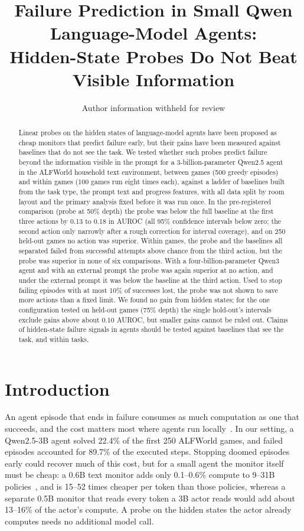 \documentclass[10pt]{article}
\title{Failure Prediction in Small Qwen Language-Model Agents:\\Hidden-State Probes Do Not Beat Visible Information}
\author{Author information withheld for review}
\date{}
\begin{document}
\maketitle

\begin{abstract}
Linear probes on the hidden states of language-model agents have been proposed as cheap monitors that predict failure early, but their gains have been measured against baselines that do not see the task.
We tested whether such probes predict failure beyond the information visible in the prompt for a 3-billion-parameter Qwen2.5 agent in the ALFWorld household text environment,
between games (500 greedy episodes) and within games (100 games run eight times each), against a ladder of baselines built from the task type, the prompt text and progress features, with all data split by room layout and the primary analysis fixed before it was run once.
In the pre-registered comparison (probe at 50\% depth) the probe was below the full baseline at the first three actions by 0.13 to 0.18 in AUROC (all 95\% confidence intervals below zero; the second action only narrowly after a rough correction for interval coverage), and on 250 held-out games no action was superior.
Within games, the probe and the baselines all separated failed from successful attempts above chance from the third action, but the probe was superior in none of six comparisons.
With a four-billion-parameter Qwen3 agent and with an external prompt the probe was again superior at no action, and under the external prompt it was below the baseline at the third action.
Used to stop failing episodes with at most 10\% of successes lost, the probe was not shown to save more actions than a fixed limit.
We found no gain from hidden states; for the one configuration tested on held-out games (75\% depth) the single hold-out's intervals exclude gains above about 0.10 AUROC, but smaller gains cannot be ruled out.
Claims of hidden-state failure signals in agents should be tested against baselines that see the task, and within tasks.
\end{abstract}

\section{Introduction}
An agent episode that ends in failure consumes as much computation as one that succeeds, and the cost matters most where agents run locally~\cite{pham2026agentstop}.
In our setting, a Qwen2.5-3B agent solved 22.4\% of the first 250 ALFWorld games, and failed episodes accounted for 89.7\% of the executed steps.
Stopping doomed episodes early could recover much of this cost, but for a small agent the monitor itself must be cheap: a 0.6B text monitor adds only 0.1--0.6\% compute to 9--31B policies~\cite{wang2026failfast},
and is 15--52 times cheaper per token than those policies, whereas a separate 0.5B monitor that reads every token a 3B actor reads would add about 13--16\% of the actor's compute. A probe on the hidden states the actor already computes needs no additional model call.
\end{document}
